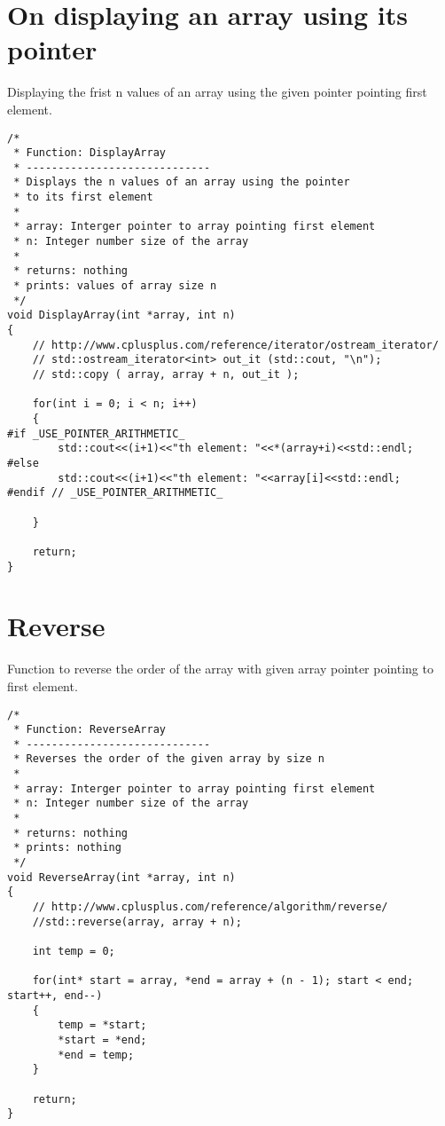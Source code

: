 \documentclass{article}
\begin{document}
\section{On displaying an array using its pointer}

Displaying the frist n values of an array using the given pointer pointing first element.

\begin{lstlisting}[label=lab3.4,caption=Displaying Array]
/*
 * Function: DisplayArray
 * -----------------------------
 * Displays the n values of an array using the pointer
 * to its first element
 *
 * array: Interger pointer to array pointing first element
 * n: Integer number size of the array
 *
 * returns: nothing
 * prints: values of array size n
 */
void DisplayArray(int *array, int n)
{
    // http://www.cplusplus.com/reference/iterator/ostream_iterator/
    // std::ostream_iterator<int> out_it (std::cout, "\n");
    // std::copy ( array, array + n, out_it );

    for(int i = 0; i < n; i++)
    {
#if _USE_POINTER_ARITHMETIC_
        std::cout<<(i+1)<<"th element: "<<*(array+i)<<std::endl;
#else
        std::cout<<(i+1)<<"th element: "<<array[i]<<std::endl;
#endif // _USE_POINTER_ARITHMETIC_

    }

    return;
}
\end{lstlisting}	



\section{Reverse}

Function to reverse the order of the array with given array pointer pointing to first element.

\begin{lstlisting}[label=lab3.5,caption=Reversing Array]
/*
 * Function: ReverseArray
 * -----------------------------
 * Reverses the order of the given array by size n
 *
 * array: Interger pointer to array pointing first element
 * n: Integer number size of the array
 *
 * returns: nothing
 * prints: nothing
 */
void ReverseArray(int *array, int n)
{
    // http://www.cplusplus.com/reference/algorithm/reverse/
    //std::reverse(array, array + n);

    int temp = 0;

    for(int* start = array, *end = array + (n - 1); start < end; start++, end--)
    {
        temp = *start;
        *start = *end;
        *end = temp;
    }

    return;
}
\end{lstlisting}	
\end{document}
